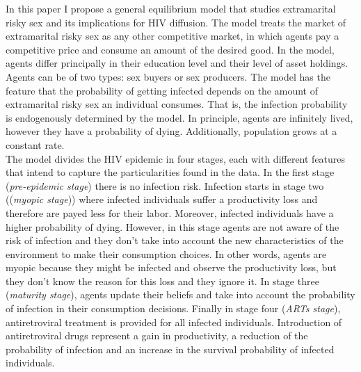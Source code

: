 In this paper I propose a general equilibrium model that studies extramarital risky sex and its implications for HIV diffusion. The model treats the market of extramarital risky sex as any other competitive market, in which agents pay a competitive price and consume an amount of the desired good. In the model, agents differ principally in their education level and their level of asset holdings. Agents can be of two types: sex buyers or sex producers. The model has the feature that the probability of getting infected depends on the amount of extramarital risky sex an individual consumes. That is, the infection probability is endogenously determined by the model. In principle, agents are infinitely lived, however they have a probability of dying. Additionally, population grows at a constant rate.\\

The model divides the HIV epidemic in four stages, each with different features that intend to capture the particularities found in the data. In the first stage (\textit{pre-epidemic stage}) there is no infection risk. Infection starts in stage two ((\textit{myopic stage})) where infected individuals suffer a productivity loss and therefore are payed less for their labor. Moreover, infected individuals have a higher probability of dying. However, in this stage agents are not aware of the risk of infection and they don't take into account the new characteristics of the environment to make their consumption choices. In other words, agents are myopic because they might be infected and observe the productivity loss, but they don't know the reason for this loss and they ignore it. In stage three (\textit{maturity stage}), agents update their beliefs and take into account the probability of infection in their consumption decisions. Finally in stage four (\textit{ARTs stage}), antiretroviral treatment is provided for all infected individuals. Introduction of antiretroviral drugs represent a gain in productivity, a reduction of the probability of infection and an increase in the survival probability of infected individuals.\\

